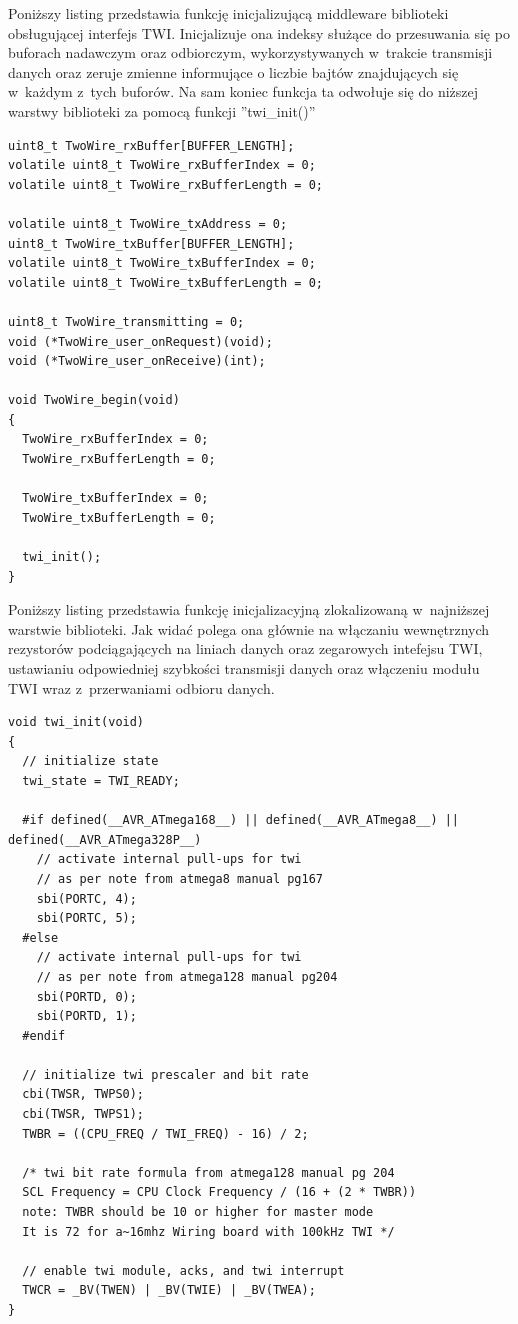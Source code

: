 \documentclass[11pt, twoside]{Thesis} %
\begin{document}
Poniższy listing przedstawia funkcję inicjalizującą middleware biblioteki obsługującej interfejs TWI. Inicjalizuje ona indeksy służące do przesuwania się po buforach nadawczym oraz odbiorczym, wykorzystywanych w~trakcie transmisji danych oraz zeruje zmienne informujące o liczbie bajtów znajdujących się w~każdym z~tych buforów. Na sam koniec funkcja ta odwołuje się do niższej warstwy biblioteki za pomocą funkcji ''twi\_init()''


\begin{lstlisting}
uint8_t TwoWire_rxBuffer[BUFFER_LENGTH];
volatile uint8_t TwoWire_rxBufferIndex = 0;
volatile uint8_t TwoWire_rxBufferLength = 0;

volatile uint8_t TwoWire_txAddress = 0;
uint8_t TwoWire_txBuffer[BUFFER_LENGTH];
volatile uint8_t TwoWire_txBufferIndex = 0;
volatile uint8_t TwoWire_txBufferLength = 0;

uint8_t TwoWire_transmitting = 0;
void (*TwoWire_user_onRequest)(void);
void (*TwoWire_user_onReceive)(int);

void TwoWire_begin(void)
{
  TwoWire_rxBufferIndex = 0;
  TwoWire_rxBufferLength = 0;

  TwoWire_txBufferIndex = 0;
  TwoWire_txBufferLength = 0;

  twi_init();
}
\end{lstlisting}

Poniższy listing przedstawia funkcję inicjalizacyjną zlokalizowaną w~najniższej warstwie biblioteki. Jak widać polega ona głównie na włączaniu wewnętrznych rezystorów podciągających na liniach danych oraz zegarowych intefejsu TWI, ustawianiu odpowiedniej szybkości transmisji danych oraz włączeniu modułu TWI wraz z~przerwaniami odbioru danych.

\begin{lstlisting}
void twi_init(void)
{
  // initialize state
  twi_state = TWI_READY;

  #if defined(__AVR_ATmega168__) || defined(__AVR_ATmega8__) || defined(__AVR_ATmega328P__)
    // activate internal pull-ups for twi
    // as per note from atmega8 manual pg167
    sbi(PORTC, 4);
    sbi(PORTC, 5);
  #else
    // activate internal pull-ups for twi
    // as per note from atmega128 manual pg204
    sbi(PORTD, 0);
    sbi(PORTD, 1);
  #endif

  // initialize twi prescaler and bit rate
  cbi(TWSR, TWPS0);
  cbi(TWSR, TWPS1);
  TWBR = ((CPU_FREQ / TWI_FREQ) - 16) / 2;

  /* twi bit rate formula from atmega128 manual pg 204
  SCL Frequency = CPU Clock Frequency / (16 + (2 * TWBR))
  note: TWBR should be 10 or higher for master mode
  It is 72 for a~16mhz Wiring board with 100kHz TWI */

  // enable twi module, acks, and twi interrupt
  TWCR = _BV(TWEN) | _BV(TWIE) | _BV(TWEA);
}
\end{lstlisting}
\end{document}

